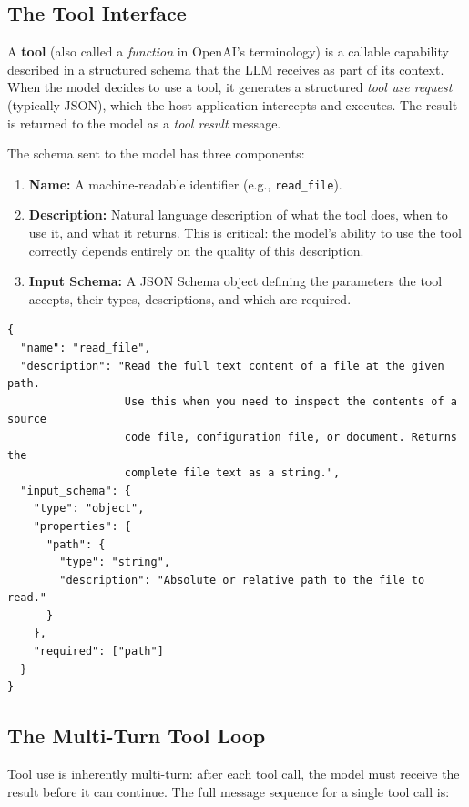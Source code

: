 \documentclass[11pt,letterpaper]{article}
\begin{document}
\subsection{The Tool Interface}

A \textbf{tool} (also called a \emph{function} in OpenAI's terminology) is a callable capability described in a structured schema that the LLM receives as part of its context. When the model decides to use a tool, it generates a structured \emph{tool use request} (typically JSON), which the host application intercepts and executes. The result is returned to the model as a \emph{tool result} message.

The schema sent to the model has three components:
\begin{enumerate}[leftmargin=*]
    \item \textbf{Name:} A machine-readable identifier (e.g., \texttt{read\_file}).
    \item \textbf{Description:} Natural language description of what the tool does, when to use it, and what it returns. This is critical: the model's ability to use the tool correctly depends entirely on the quality of this description.
    \item \textbf{Input Schema:} A JSON Schema object defining the parameters the tool accepts, their types, descriptions, and which are required.
\end{enumerate}

\begin{lstlisting}[style=JSONStyle, caption={Tool definition in Anthropic API format}]
{
  "name": "read_file",
  "description": "Read the full text content of a file at the given path.
                  Use this when you need to inspect the contents of a source
                  code file, configuration file, or document. Returns the
                  complete file text as a string.",
  "input_schema": {
    "type": "object",
    "properties": {
      "path": {
        "type": "string",
        "description": "Absolute or relative path to the file to read."
      }
    },
    "required": ["path"]
  }
}
\end{lstlisting}

\subsection{The Multi-Turn Tool Loop}

Tool use is inherently multi-turn: after each tool call, the model must receive the result before it can continue. The full message sequence for a single tool call is:
\end{document}
